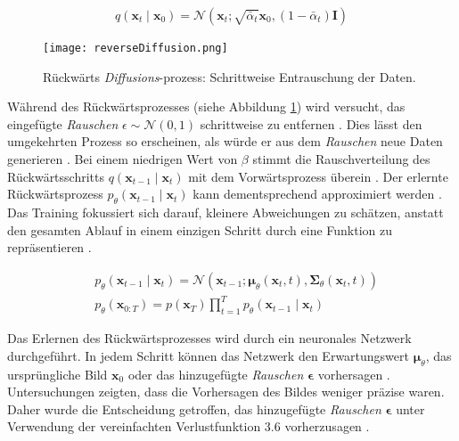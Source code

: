 \documentclass[
  a4paper,  %
  twoside,  %
  bibliography=totoc,
  headsepline,
  cleardoublepage=empty,
  parskip=half,
  draft=false
]{scrbook}
\begin{document}
\begin{equation}
    q\left(\mathbf{x}_t \mid \mathbf{x}_0\right)=\mathcal{N}\left(\mathbf{x}_t ; \sqrt{\bar{\alpha}_t} \mathbf{x}_0,\left(1-\bar{\alpha}_t\right) \mathbf{I}\right)
\end{equation}

\begin{figure}[h]
  \centering
  \texttt{[image: reverseDiffusion.png]}
  \caption[Rückwertsprozess Diffusion]{Rückwärts \emph{Diffusions}-prozess: Schrittweise Entrauschung der Daten. \cite{machine_learning_at_berkeley_diffusion_2022}}
  \label{fig:reverseDiffusion}
\end{figure} 

Während des Rückwärtsprozesses (siehe Abbildung \ref{fig:reverseDiffusion}) wird versucht, das eingefügte \emph{Rauschen} $\epsilon \sim \mathcal{N}(0,1)$ schrittweise zu entfernen \cite{machine_learning_at_berkeley_diffusion_2022}. Dies lässt den umgekehrten Prozess so erscheinen, als würde er aus dem \emph{Rauschen} neue Daten generieren \cite{machine_learning_at_berkeley_diffusion_2022}. Bei einem niedrigen Wert von $\beta$ stimmt die Rauschverteilung des Rückwärtsschritts \( q\left(\mathbf{x}_{t-1} \mid \mathbf{x}_t\right) \) mit dem Vorwärtsprozess überein \cite{sohl-dickstein_deep_2015}. Der erlernte Rückwärtsprozess \( p_\theta\left(\mathbf{x}_{t-1} \mid \mathbf{x}_t\right) \) kann dementsprechend approximiert werden \cite{ho_denoising_2020, machine_learning_at_berkeley_diffusion_2022, nichol_improved_2021}. Das Training fokussiert sich darauf, kleinere Abweichungen zu schätzen, anstatt den gesamten Ablauf in einem einzigen Schritt durch eine Funktion zu repräsentieren \cite{sohl-dickstein_deep_2015}.


\begin{align}
& p_\theta\left(\mathbf{x}_{t-1} \mid \mathbf{x}_t\right)=\mathcal{N}\left(\mathbf{x}_{t-1} ; \boldsymbol{\mu}_\theta\left(\mathbf{x}_t, t\right), \boldsymbol{\Sigma}_\theta\left(\mathbf{x}_t, t\right)\right)\\
& p_\theta\left(\mathbf{x}_{0: T}\right)=p\left(\mathbf{x}_T\right) \prod_{t=1}^T p_\theta\left(\mathbf{x}_{t-1} \mid \mathbf{x}_t\right)
\end{align}

Das Erlernen des Rückwärtsprozesses wird durch ein neuronales Netzwerk durchgeführt. In jedem Schritt können das Netzwerk den Erwartungswert $\boldsymbol{\mu}_\theta$, das ursprüngliche Bild $\boldsymbol{x}_0$ oder das hinzugefügte \emph{Rauschen} $\boldsymbol{\epsilon}$ vorhersagen \cite{ho_denoising_2020, nichol_improved_2021}. Untersuchungen zeigten, dass die Vorhersagen des Bildes weniger präzise waren. Daher wurde die Entscheidung getroffen, das hinzugefügte \emph{Rauschen} $\boldsymbol{\epsilon}$ unter Verwendung der vereinfachten Verlustfunktion 3.6 vorherzusagen \cite{ho_denoising_2020}.
\end{document}

